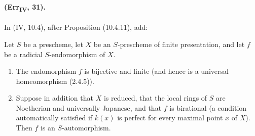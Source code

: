 \paragraph{(Err\textsubscript{IV}, 31).}
In (IV, 10.4), after Proposition (10.4.11), add:

\begin{corollary}[10.4.12]
Let $S$ be a prescheme, let $X$ be an $S$-prescheme of finite
presentation, and let $f$ be a radicial $S$-endomorphism of $X$.
\begin{enumerate}[label=\textup{(\roman*)}]
\item The endomorphism $f$ is bijective and finite (and hence is a
universal homeomorphism (2.4.5)).
\item Suppose in addition that $X$ is reduced, that the local rings of
$S$ are Noetherian and universally Japanese, and that $f$ is
birational (a condition automatically satisfied if $k(x)$ is perfect
for every maximal point $x$ of $X$).  Then $f$ is an
$S$-automorphism.
\end{enumerate}
\end{corollary}

